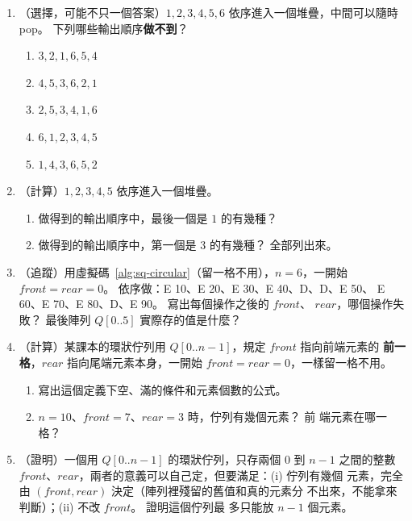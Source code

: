 \begin{enumerate}
\item （選擇，可能不只一個答案）$1, 2, 3, 4, 5, 6$ 依序進入一個堆疊，中間可以隨時
pop。 下列哪些輸出順序\textbf{做不到}？
\begin{enumerate}
\item $3, 2, 1, 6, 5, 4$
\item $4, 5, 3, 6, 2, 1$
\item $2, 5, 3, 4, 1, 6$
\item $6, 1, 2, 3, 4, 5$
\item $1, 4, 3, 6, 5, 2$
\end{enumerate}

\item （計算）$1, 2, 3, 4, 5$ 依序進入一個堆疊。
\begin{enumerate}
\item 做得到的輸出順序中，最後一個是 $1$ 的有幾種？
\item 做得到的輸出順序中，第一個是 $3$ 的有幾種？ 全部列出來。
\end{enumerate}

\item （追蹤）用虛擬碼~\ref{alg:sq-circular}（留一格不用），$n = 6$，一開始
$\mathit{front} = \mathit{rear} = 0$。 依序做：E 10、E 20、E 30、E 40、D、D、E 50、
E 60、E 70、E 80、D、E 90。 寫出每個操作之後的 $\mathit{front}$、
$\mathit{rear}$，哪個操作失敗？ 最後陣列 $Q[0..5]$ 實際存的值是什麼？

\item \label{q:sq-front-before}（計算）某課本的環狀佇列用 $Q[0..n-1]$，規定 $\mathit{front}$ 指向前端元素的
\textbf{前一格}，$\mathit{rear}$ 指向尾端元素本身，一開始
$\mathit{front} = \mathit{rear} = 0$，一樣留一格不用。
\begin{enumerate}
\item 寫出這個定義下空、滿的條件和元素個數的公式。
\item $n = 10$、$\mathit{front} = 7$、$\mathit{rear} = 3$ 時，佇列有幾個元素？ 前
端元素在哪一格？
\end{enumerate}

\item \label{q:sq-pigeon}（證明）一個用 $Q[0..n-1]$ 的環狀佇列，只存兩個 $0$ 到 $n - 1$ 之間的整數
$\mathit{front}$、$\mathit{rear}$，兩者的意義可以自己定，但要滿足：(i) 佇列有幾個
元素，完全由 $(\mathit{front}, \mathit{rear})$ 決定（陣列裡殘留的舊值和真的元素分
不出來，不能拿來判斷）；(ii)  不改 $\mathit{front}$。 證明這個佇列最
多只能放 $n - 1$ 個元素。


\end{enumerate}
